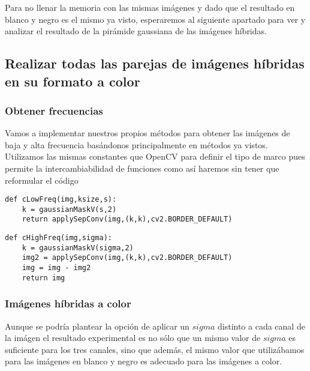 \documentclass{article}
\newcommand{\img}[2]{
\noindent\makebox[\textwidth][c]{\texttt{[image: \#1]}}%
}
\begin{document}
Para no llenar la memoria con las mismas imágenes y dado que el resultado en blanco y negro es el mismo ya visto, esperaremos al siguiente apartado para ver y analizar el resultado de la pirámide gaussiana de las imágenes híbridas.

\subsection{Realizar todas las parejas de imágenes híbridas en su formato a color}

\subsubsection{Obtener frecuencias}

Vamos a implementar nuestros propios métodos para obtener las imágenes de baja y alta frecuencia basándonos principalmente en métodos ya vistos. Utilizamos las mismas constantes que OpenCV para definir el tipo de marco pues permite la intercambiabilidad de funciones como así haremos sin tener que reformular el código

\begin{lstlisting}
def cLowFreq(img,ksize,s):
    k = gaussianMaskV(s,2)
    return applySepConv(img,(k,k),cv2.BORDER_DEFAULT)
\end{lstlisting}

\begin{lstlisting}
def cHighFreq(img,sigma):
    k = gaussianMaskV(sigma,2)
    img2 = applySepConv(img,(k,k),cv2.BORDER_DEFAULT)
    img = img - img2
    return img
\end{lstlisting}

\subsubsection{Imágenes híbridas a color}

Aunque se podría plantear la opción de aplicar un $sigma$ distinto a cada canal de la imágen el resultado experimental es no sólo que un mismo valor de $sigma$ es suficiente para los tres canales, sino que además, el mismo valor que utilizábamos para las imágenes en blanco y negro es adecuado para las imágenes a color.

\img{eximg/ej11_1}{0.8}
\\

\img{eximg/ej11_2}{0.8}
\\

\img{eximg/ej11_3}{0.8}
\\
\end{document}
